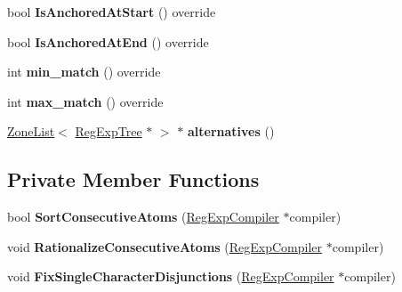 \begin{DoxyCompactItemize}
\item 
bool {\bfseries Is\+Anchored\+At\+Start} () override\hypertarget{classv8_1_1internal_1_1_reg_exp_disjunction_a246ccce408ccc7808dcabf878dc5eb3d}{}\label{classv8_1_1internal_1_1_reg_exp_disjunction_a246ccce408ccc7808dcabf878dc5eb3d}

\item 
bool {\bfseries Is\+Anchored\+At\+End} () override\hypertarget{classv8_1_1internal_1_1_reg_exp_disjunction_ab5fefa867a9a6e84562a2a835cc2f973}{}\label{classv8_1_1internal_1_1_reg_exp_disjunction_ab5fefa867a9a6e84562a2a835cc2f973}

\item 
int {\bfseries min\+\_\+match} () override\hypertarget{classv8_1_1internal_1_1_reg_exp_disjunction_abccb51386f1141ae8bd3db4fdabaf66b}{}\label{classv8_1_1internal_1_1_reg_exp_disjunction_abccb51386f1141ae8bd3db4fdabaf66b}

\item 
int {\bfseries max\+\_\+match} () override\hypertarget{classv8_1_1internal_1_1_reg_exp_disjunction_a16acdd002a6b5cb5fca72547a945ac63}{}\label{classv8_1_1internal_1_1_reg_exp_disjunction_a16acdd002a6b5cb5fca72547a945ac63}

\item 
\hyperlink{classv8_1_1internal_1_1_zone_list}{Zone\+List}$<$ \hyperlink{classv8_1_1internal_1_1_reg_exp_tree}{Reg\+Exp\+Tree} $\ast$ $>$ $\ast$ {\bfseries alternatives} ()\hypertarget{classv8_1_1internal_1_1_reg_exp_disjunction_a3c09297cc347f66037663c57eb9efb7b}{}\label{classv8_1_1internal_1_1_reg_exp_disjunction_a3c09297cc347f66037663c57eb9efb7b}

\end{DoxyCompactItemize}
\subsection*{Private Member Functions}
\begin{DoxyCompactItemize}
\item 
bool {\bfseries Sort\+Consecutive\+Atoms} (\hyperlink{classv8_1_1internal_1_1_reg_exp_compiler}{Reg\+Exp\+Compiler} $\ast$compiler)\hypertarget{classv8_1_1internal_1_1_reg_exp_disjunction_ae00b61fd53c3fd3673d64bf2104b7692}{}\label{classv8_1_1internal_1_1_reg_exp_disjunction_ae00b61fd53c3fd3673d64bf2104b7692}

\item 
void {\bfseries Rationalize\+Consecutive\+Atoms} (\hyperlink{classv8_1_1internal_1_1_reg_exp_compiler}{Reg\+Exp\+Compiler} $\ast$compiler)\hypertarget{classv8_1_1internal_1_1_reg_exp_disjunction_a815a88f516aa24e38fcbc60c984ffdf8}{}\label{classv8_1_1internal_1_1_reg_exp_disjunction_a815a88f516aa24e38fcbc60c984ffdf8}

\item 
void {\bfseries Fix\+Single\+Character\+Disjunctions} (\hyperlink{classv8_1_1internal_1_1_reg_exp_compiler}{Reg\+Exp\+Compiler} $\ast$compiler)\hypertarget{classv8_1_1internal_1_1_reg_exp_disjunction_ac53cb8b6dcbeac7ed17a703443553e69}{}\label{classv8_1_1internal_1_1_reg_exp_disjunction_ac53cb8b6dcbeac7ed17a703443553e69}

\end{DoxyCompactItemize}
